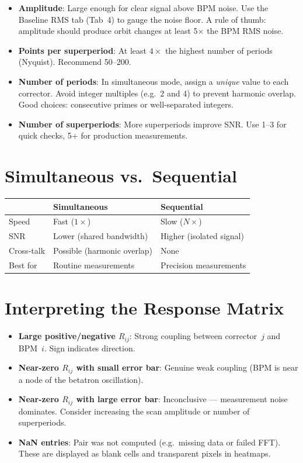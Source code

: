 \documentclass[11pt,a4paper,twoside]{report}
\begin{document}
\begin{defbox}
\begin{itemize}
  \item \textbf{Amplitude}: Large enough for clear signal above BPM noise. Use the Baseline RMS tab (Tab~4) to gauge the noise floor. A rule of thumb: amplitude should produce orbit changes at least 5$\times$ the BPM RMS noise.
  \item \textbf{Points per superperiod}: At least $4\times$ the highest number of periods (Nyquist). Recommend 50--200.
  \item \textbf{Number of periods}: In simultaneous mode, assign a \emph{unique} value to each corrector. Avoid integer multiples (e.g.\ 2 and 4) to prevent harmonic overlap. Good choices: consecutive primes or well-separated integers.
  \item \textbf{Number of superperiods}: More superperiods improve SNR. Use 1--3 for quick checks, 5+ for production measurements.
\end{itemize}
\end{defbox}

\section{Simultaneous vs.\ Sequential}

\begin{tabularx}{\textwidth}{lXX}
  \toprule
  & \textbf{Simultaneous} & \textbf{Sequential} \\
  \midrule
  Speed        & Fast ($1\times$)            & Slow ($N\times$)            \\
  SNR          & Lower (shared bandwidth)     & Higher (isolated signal)    \\
  Cross-talk   & Possible (harmonic overlap)  & None                        \\
  Best for     & Routine measurements         & Precision measurements      \\
  \bottomrule
\end{tabularx}

\section{Interpreting the Response Matrix}

\begin{itemize}
  \item \textbf{Large positive/negative $R_{ij}$}: Strong coupling between corrector~$j$ and BPM~$i$. Sign indicates direction.
  \item \textbf{Near-zero $R_{ij}$ with small error bar}: Genuine weak coupling (BPM is near a node of the betatron oscillation).
  \item \textbf{Near-zero $R_{ij}$ with large error bar}: Inconclusive --- measurement noise dominates. Consider increasing the scan amplitude or number of superperiods.
  \item \textbf{NaN entries}: Pair was not computed (e.g.\ missing data or failed FFT). These are displayed as blank cells and transparent pixels in heatmaps.
\end{itemize}
\end{document}
